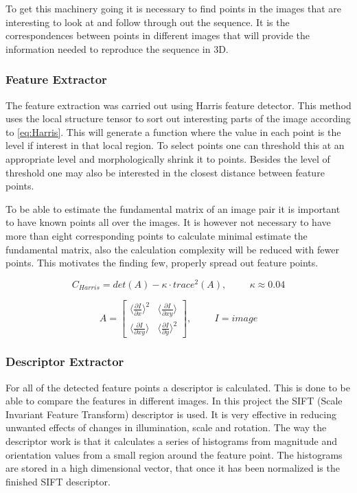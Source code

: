 To get this machinery going it is necessary to find points in the images that are interesting to look at and follow through out the sequence. It is the correspondences between points in different images that will provide the information needed to reproduce the sequence in 3D. 

\subsubsection{Feature Extractor}
The feature extraction was carried out using Harris feature detector. This method uses the local structure tensor to sort out interesting parts of the image according to \eqref{eq:Harris}. This will generate a function where the value in each point is the level if interest in that local region. To select points one can threshold this at an appropriate level and morphologically shrink it to points. Besides the level of threshold one may also be interested in the closest distance between feature points. 

To be able to estimate the fundamental matrix of an image pair it is important to have known points all over the images. It is however not necessary to have more than eight corresponding points to calculate minimal estimate the fundamental matrix, also the calculation complexity will be reduced with fewer points. This motivates the finding few, properly spread out feature points. 

\begin{equation}
\label{eq:Harris}
C_{Harris} = det(A) - \kappa \cdot trace^2(A), \hspace{1cm} \kappa \approx 0.04
\end{equation} 

\begin{equation}
\label{eq:StructureTensor}
A =  \begin{bmatrix}
	   \langle \frac{\partial I}{\partial x} \rangle^2 &  \langle \frac{\partial I}{\partial x y} \rangle \\
	   \langle \frac{\partial I}{\partial x y} \rangle & \langle \frac{\partial I}{\partial y} \rangle^2
	  \end{bmatrix}
	  , \hspace{1cm} I = image
\end{equation}

\subsubsection{Descriptor Extractor}
For all of the detected feature points a descriptor is calculated. This is done to be able to compare the features in different images. In this project the SIFT (Scale Invariant Feature Transform) descriptor is used. It is very effective in reducing unwanted effects of changes in illumination, scale and rotation. The way the descriptor work is that it calculates a series of histograms from magnitude and orientation values from a small region around the feature point. The histograms are stored in a high dimensional vector, that once it has been normalized is the finished SIFT descriptor.

